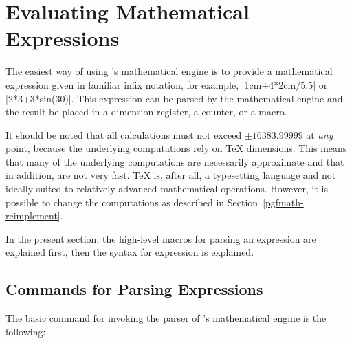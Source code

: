 %
%
%
%

\section{Evaluating Mathematical Expressions}

The easiest way of using \pgfname's mathematical engine is to provide
a mathematical expression given in familiar infix notation, for 
example, |1cm+4*2cm/5.5| or |2*3+3*sin(30)|. This expression can be 
parsed by the mathematical engine and the result be placed in a 
dimension register, a counter, or a macro. 

It should be noted that all 
calculations must not exceed $\pm16383.99999$ at \emph{any} point, 
because the underlying computations rely on \TeX{} dimensions. This
means that many of the underlying computations are necessarily
approximate and that in addition, are not very fast. \TeX{} is, 
after all, a typesetting language and not ideally
suited to relatively advanced mathematical operations. However, it 
is possible to change the computations as described in
Section~\ref{pgfmath-reimplement}. 

In the present section, the high-level macros for parsing an
expression are explained first, then the syntax for expression is
explained.


\subsection{Commands for Parsing Expressions}

\label{pgfmath-registers}

\label{pgfmath-parsing}

The basic command for invoking the parser of \pgfname's mathematical
engine is the following:

